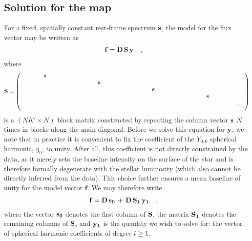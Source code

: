 \documentclass[modern]{aastex631}
\begin{document}
\subsection{Solution for the map}
\label{sec:solve_y}
%
For a fixed, spatially constant rest-frame spectrum ${\mathbf{s}}$, the model for the flux vector may be written as
%
\begin{align}
    \label{eq:inverse:fy}
    {\ensuremath{\mathbf{f}}}
     & =
    {\mathbf{D}}
    \,
    {\mathbf{S}}
    \,
    {\mathbf{y}}
    \quad,
\end{align}
%
where
%
\begin{align}
    \label{eq:inverse:S}
    {\ensuremath{\mathbf{S}}} =
    \begin{pmatrix}
        \quad\quad\quad\quad{\ensuremath{\mathbf{s}}}\quad\quad\quad\quad &                            &                            &                            &        \\
                                   & \quad\quad\quad\quad{\ensuremath{\mathbf{s}}}\quad\quad\quad\quad &                            &                            &        \\
                                   &                            & \quad\quad\quad\quad{\ensuremath{\mathbf{s}}}\quad\quad\quad\quad &                            &        \\
                                   &                            &                            & \quad\quad\quad\quad{\ensuremath{\mathbf{s}}}\quad\quad\quad\quad &        \\
                                   &                            &                            &                            & \ddots
    \end{pmatrix}
\end{align}
%
is a $(NK' \times N)$ block matrix constructed by repeating the column vector ${\mathbf{s}}$ $N$ times in blocks along the main diagonal.
Before we solve this equation for ${\mathbf{y}}$, we note that in practice it is convenient to fix the coefficient of the $Y_{0,0}$ spherical harmonic, $y_0$, to unity. 
After all, this coefficient is not directly constrained by the data, as it merely sets the baseline intensity on the surface of the star and is therefore formally degenerate with the stellar luminosity (which also cannot be directly inferred from the data). 
This choice further ensures a mean baseline of unity for the model vector $\mathbf{f}$. 
We may therefore write
%
\begin{align}
    \label{eq:inverse:fy1}
    {\ensuremath{\mathbf{f}}}
     & =
    {\mathbf{D}}
    \,
    {\mathbf{s}}_{\mathbf{0}}
    \,
    +
    \,
    {\mathbf{D}}
    \,
    {\mathbf{S_1}}
    \,
    {\mathbf{y}}_{\mathbf{1}}
    \quad,
\end{align}
%
where the vector ${\mathbf{s_0}}$ denotes the first column of ${\mathbf{S}}$, the matrix ${\mathbf{S_1}}$ denotes the remaining columns of ${\mathbf{S}}$, and ${\mathbf{y_1}}$ is the quantity we wish to solve for: the vector of spherical harmonic coefficients of degree $l \ge 1$.
\end{document}
